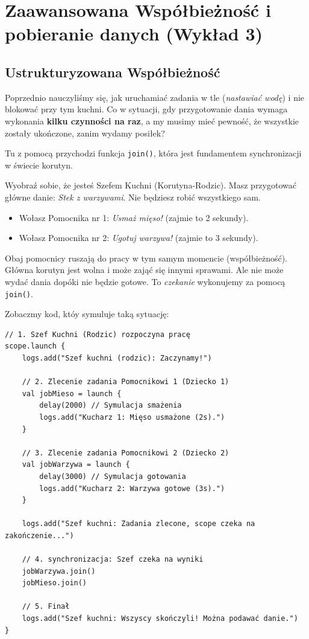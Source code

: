 \chapter{Zaawansowana Współbieżność i pobieranie danych (Wykład 3)}

\section{Ustrukturyzowana Współbieżność}

Poprzednio nauczyliśmy się, jak uruchamiać zadania w tle (\textit{nastawiać wodę}) i nie blokować przy tym kuchni. Co w sytuacji, gdy przygotowanie dania wymaga wykonania \textbf{kilku czynności na raz}, a my musimy mieć pewność, że wszystkie zostały ukończone, zanim wydamy posiłek?

Tu z pomocą przychodzi funkcja \texttt{join()}, która jest fundamentem synchronizacji w świecie korutyn.

Wyobraź sobie, że jesteś Szefem Kuchni (Korutyna-Rodzic). Masz przygotować główne danie: \textit{Stek z warzywami}. Nie będziesz robić wszystkiego sam.
\begin{itemize}
\item Wołasz Pomocnika nr 1: \textit{Usmaż mięso!} (zajmie to 2 sekundy).
\item Wołasz Pomocnika nr 2: \textit{Ugotuj warzywa!} (zajmie to 3 sekundy).
\end{itemize}

Obaj pomocnicy ruszają do pracy w tym samym momencie (współbieżność). Główna korutyn jest wolna i może zająć się innymi sprawami. Ale nie może wydać dania dopóki nie będzie gotowe. To \textit{czekanie} wykonujemy za pomocą \texttt{join()}.

Zobaczmy kod, któy symuluje taką sytuację:

\begin{verbatim}
// 1. Szef Kuchni (Rodzic) rozpoczyna pracę
scope.launch {
    logs.add("Szef kuchni (rodzic): Zaczynamy!")

    // 2. Zlecenie zadania Pomocnikowi 1 (Dziecko 1)
    val jobMieso = launch {
        delay(2000) // Symulacja smażenia
        logs.add("Kucharz 1: Mięso usmażone (2s).")
    }

    // 3. Zlecenie zadania Pomocnikowi 2 (Dziecko 2)
    val jobWarzywa = launch {
        delay(3000) // Symulacja gotowania
        logs.add("Kucharz 2: Warzywa gotowe (3s).")
    }

    logs.add("Szef kuchni: Zadania zlecone, scope czeka na zakończenie...")

    // 4. synchronizacja: Szef czeka na wyniki
    jobWarzywa.join()
    jobMieso.join()

    // 5. Finał
    logs.add("Szef kuchni: Wszyscy skończyli! Można podawać danie.")
}
\end{verbatim}

